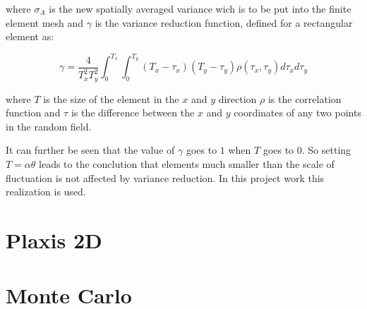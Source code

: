 where $\sigma_A$ is the new spatially averaged variance wich is to be put into the finite element mesh and $\gamma$ is the variance reduction function, defined for a rectangular element as:

\begin{equation}
\label{eq3.42}
	\gamma = \frac{4}{T_x^2 T_y^2} \int_0^{T_x} \int_0^{T_y} (T_x-\tau_x)(T_y-\tau_y)\rho(\tau_x,\tau_y)d\tau_xd\tau_y
\end{equation}

where $T$ is the size of the element in the $x$ and $y$ direction $\rho$ is the correlation function and $\tau$ is the difference between the $x$ and $y$ coordinates of any two points in the random field.

It can further be seen that the value of $\gamma$ goes to $1$ when $T$ goes to $0$. So setting \(T=\alpha \theta\) leads to the conclution that elements much smaller than the scale of fluctuation is not affected by variance reduction.
In this project work this realization is used.

\section{Plaxis 2D}

\section{Monte Carlo}





